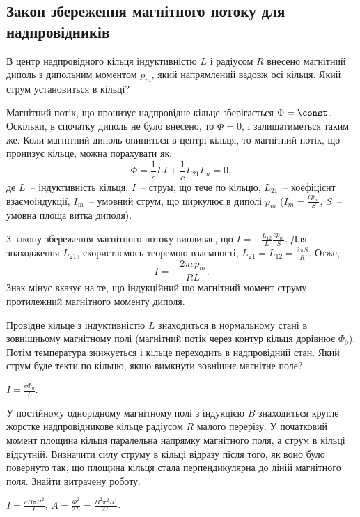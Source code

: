 \subsection*{Закон збереження магнітного потоку для надпровідників}


\begin{problem}
В центр надпровідного кільця індуктивністю $L$ і радіусом $R$ внесено магнітний диполь з дипольним моментом $p_m$, який напрямлений вздовж осі кільця. Який струм установиться в кільці?
\begin{solution}
	Магнітний потік, що пронизує надпровідне кільце зберігається $\Phi = \const$. Оскільки, в спочатку диполь не було внесено, то $\Phi = 0$, і залишатиметься таким же. Коли магнітний диполь опиниться в центрі кільця, то магнітний потік, що пронизує кільце, можна порахувати як:
	\[
		\Phi = \frac1c LI + \frac1c L_{21}I_m = 0,
	\]
	де $L$~-- індуктивність кільця, $I$~-- струм, що тече по кільцю, $L_{21}$~-- коефіцієнт взаємоіндукції, $I_m$~-- умовний струм, що циркулює в диполі $p_m$ ($I_m = \frac{cp_m}{S}$, $S$~-- умовна площа витка диполя).

	З закону збереження магнітного потоку випливає, що $I = - \frac{L_{12}}{L}\frac{cp_m}{S}$.
	Для знаходження $L_{21}$, скористаємось теоремою взаємності, $L_{21} = L_{12} = \frac{2\pi S}{R}$.
	Отже,
	\[
		I = - \frac{ 2\pi c p_m}{RL}.
	\]
	Знак мінус вказує на те, що індукційний що магнітний момент струму протилежний магнітного моменту диполя.
\end{solution}
\end{problem}


\begin{problem}
Провідне кільце з індуктивністю $L$ знаходиться в нормальному стані в зовнішньому магнітному полі (магнітний потік через контур кільця дорівнює $\Phi_0$). Потім температура знижується і кільце переходить в надпровідний стан. Який струм буде текти по кільцю, якщо вимкнути зовнішнє магнітне поле?
\begin{solution}
	$I = \frac{c\Phi_0}{L}$.
\end{solution}
\end{problem}

\begin{problem}
У постійному однорідному магнітному полі з індукцією $B$ знаходиться кругле жорстке надпровідникове кільце радіусом $R$ малого перерізу. У початковий момент площина кільця паралельна напрямку магнітного поля, а струм в кільці відсутній. Визначити силу струму в кільці відразу після того, як воно було повернуто так, що площина кільця стала перпендикулярна до ліній магнітного поля. Знайти витрачену роботу.
\begin{solution}
	$I = \frac{cB\pi R^2}{L}$, $A = \frac{\Phi^2}{2L} = \frac{B^2\pi^2 R^4}{2L}$.
\end{solution}
\end{problem}


